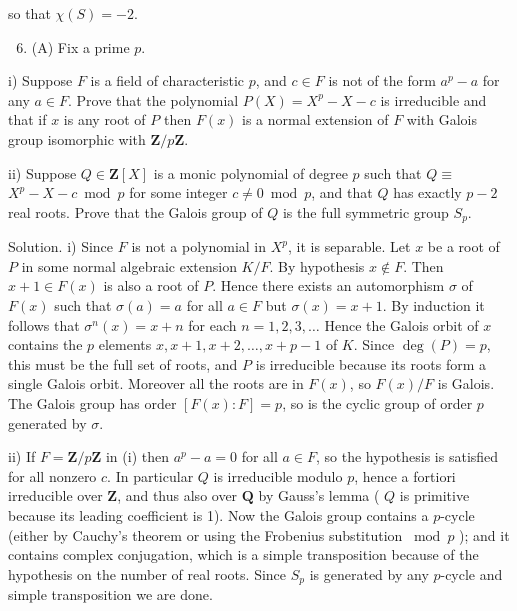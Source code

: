 \documentclass[10pt]{article}
\begin{document}
so that $\chi(S)=-2$.

\begin{enumerate}
  \setcounter{enumi}{5}
  \item (A) Fix a prime $p$.
\end{enumerate}

i) Suppose $F$ is a field of characteristic $p$, and $c \in F$ is not of the form $a^{p}-a$ for any $a \in F$. Prove that the polynomial $P(X)=X^{p}-X-c$ is irreducible and that if $x$ is any root of $P$ then $F(x)$ is a normal extension of $F$ with Galois group isomorphic with $\mathbf{Z} / p \mathbf{Z}$.

ii) Suppose $Q \in \mathbf{Z}[X]$ is a monic polynomial of degree $p$ such that $Q \equiv$ $X^{p}-X-c \bmod p$ for some integer $c \neq 0 \bmod p$, and that $Q$ has exactly $p-2$ real roots. Prove that the Galois group of $Q$ is the full symmetric group $S_{p}$.

Solution. i) Since $F$ is not a polynomial in $X^{p}$, it is separable. Let $x$ be a root of $P$ in some normal algebraic extension $K / F$. By hypothesis $x \notin F$. Then $x+1 \in F(x)$ is also a root of $P$. Hence there exists an automorphism $\sigma$ of $F(x)$ such that $\sigma(a)=a$ for all $a \in F$ but $\sigma(x)=x+1$. By induction it follows that $\sigma^{n}(x)=x+n$ for each $n=1,2,3, \ldots$ Hence the Galois orbit of $x$ contains the $p$ elements $x, x+1, x+2, \ldots, x+p-1$ of $K$. Since $\operatorname{deg}(P)=p$, this must be the full set of roots, and $P$ is irreducible because its roots form a single Galois orbit. Moreover all the roots are in $F(x)$, so $F(x) / F$ is Galois. The Galois group has order $[F(x): F]=p$, so is the cyclic group of order $p$ generated by $\sigma$.

ii) If $F=\mathbf{Z} / p \mathbf{Z}$ in (i) then $a^{p}-a=0$ for all $a \in F$, so the hypothesis is satisfied for all nonzero $c$. In particular $Q$ is irreducible modulo $p$, hence a fortiori irreducible over $\mathbf{Z}$, and thus also over $\mathbf{Q}$ by Gauss's lemma ( $Q$ is primitive because its leading coefficient is 1). Now the Galois group contains a $p$-cycle (either by Cauchy's theorem or using the Frobenius substitution $\bmod p$ ); and it contains complex conjugation, which is a simple transposition because of the hypothesis on the number of real roots. Since $S_{p}$ is generated by any $p$-cycle and simple transposition we are done.
\end{document}
